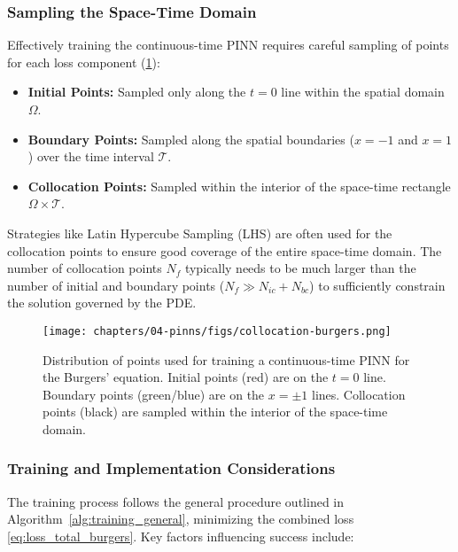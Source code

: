 \subsubsection{Sampling the Space-Time Domain}

Effectively training the continuous-time PINN requires careful sampling of points for each loss component (\cref{fig:burgers-collocation}):
\begin{itemize}
    \item \textbf{Initial Points:} Sampled only along the $t=0$ line within the spatial domain $\Omega$.
    \item \textbf{Boundary Points:} Sampled along the spatial boundaries ($x=-1$ and $x=1$) over the time interval $\mathcal{T}$.
    \item \textbf{Collocation Points:} Sampled within the interior of the space-time rectangle $\Omega \times \mathcal{T}$.
\end{itemize}
Strategies like Latin Hypercube Sampling (LHS) are often used for the collocation points to ensure good coverage of the entire space-time domain. The number of collocation points $N_f$ typically needs to be much larger than the number of initial and boundary points ($N_f \gg N_{ic} + N_{bc}$) to sufficiently constrain the solution governed by the PDE.

\begin{figure}[htbp]
    \centering
    \texttt{[image: chapters/04-pinns/figs/collocation-burgers.png]}
    \caption{Distribution of points used for training a continuous-time PINN for the Burgers' equation. Initial points (red) are on the $t=0$ line. Boundary points (green/blue) are on the $x=\pm 1$ lines. Collocation points (black) are sampled within the interior of the space-time domain.}
    \label{fig:burgers-collocation}
\end{figure}

\subsubsection{Training and Implementation Considerations}

The training process follows the general procedure outlined in Algorithm~\ref{alg:training_general}, minimizing the combined loss \eqref{eq:loss_total_burgers}. Key factors influencing success include:

